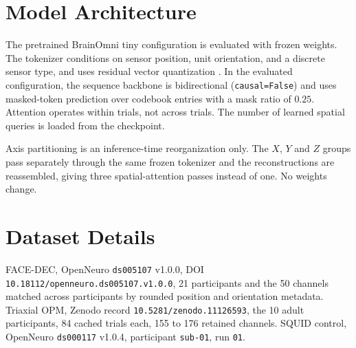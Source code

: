 \documentclass[letterpaper]{article}
\begin{document}
\section{Model Architecture}

The pretrained BrainOmni tiny configuration is evaluated with frozen weights.
The tokenizer conditions on sensor position, unit orientation, and a discrete
sensor type, and uses residual vector quantization \citep{xiao2025brainomni}. In the evaluated configuration, the sequence backbone is
bidirectional (\texttt{causal=False}) and uses masked-token prediction over
codebook entries with a mask ratio of $0.25$. Attention operates within trials,
not across trials. The number of learned spatial queries is loaded from the
checkpoint.

\noindent
Axis partitioning is an inference-time reorganization only. The $X$, $Y$ and $Z$ groups
pass separately through the same frozen tokenizer and the reconstructions are
reassembled, giving three spatial-attention passes instead of one. No weights change.

\section{Dataset Details}
FACE-DEC, OpenNeuro \texttt{ds005107} v1.0.0, DOI \texttt{10.18112/openneuro.ds005107.v1.0.0},
21 participants and the 50 channels matched across participants by rounded position and
orientation metadata. Triaxial OPM, Zenodo record \texttt{10.5281/zenodo.11126593}, the
10 adult participants, 84 cached trials each, 155 to 176 retained channels. SQUID control,
OpenNeuro \texttt{ds000117} v1.0.4, participant \texttt{sub-01}, run \texttt{01}.



\clearpage

\end{document}
